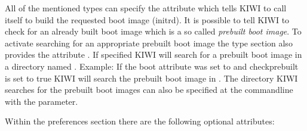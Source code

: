 All of the mentioned types can specify the  attribute
which tells KIWI to call itself to build the requested boot image (initrd).
It is possible to tell KIWI to check for an already built boot image
which is a so called \emph{prebuilt boot image}. To activate searching
for an appropriate prebuilt boot image the type section also provides the
attribute . If specified KIWI will
search for a prebuilt boot image in a directory named
. Example: If the boot
attribute was set to  and checkprebuilt is set to true
KIWI will search the prebuilt boot image in
. The directory KIWI
searches for the prebuilt boot images can also be specified at the
commandline with the  parameter.

Within the preferences section there are the following optional
attributes:

